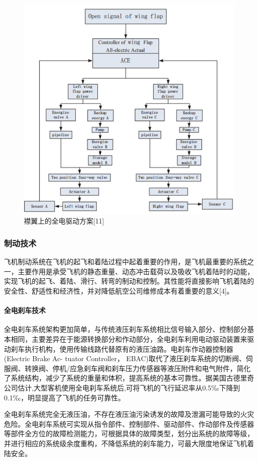\documentclass[12pt,a4paper]{report}
\begin{document}
\begin{figure}[htp]
\centering
   \includegraphics[width=.8\textwidth]{flapelectric.jpg}
    \caption{襟翼上的全电驱动方案[11]}
    \label{fig:flapelectric}
\end{figure}

\subsubsection{制动技术}
飞机制动系统在飞机的起飞和着陆过程中起着重要的作用，是飞机最重要的系统之一，主要作用是承受飞机的静态重量、动态冲击载荷以及吸收飞机着陆时的动能，实现飞机的起飞、着陆、滑行、转弯的制动和控制。其性能将直接影响飞机着陆的安全性、舒适性和经济性，并对降低航空公司维修成本有着重要的意义[4]。

\paragraph{全电刹车技术}
全电刹车系统架构更加简单，与传统液压刹车系统相比信号输入部分、控制部分基本相同，主要差异在于能源转换部分和作动部分，全电刹车利用电动驱动装置来驱动刹车执行机构，使用传输线路代替原有的液压油路。电刹车作动器控制器(Electric Brake Ac- tuator Controller， EBAC)取代了液压刹车系统的切断阀、伺服阀、转换阀、停机/应急刹车阀和刹车压力传感器等液压附件和电气附件，简化了系统结构，减少了系统的重量和体积，提高系统的基本可靠性。据美国古德里奇公司估计,大型客机使用全电刹车系统后,可将飞机的飞行延迟率从0.5‰下降到0.1‰，明显提高了飞机的任务可靠性。

全电刹车系统完全无液压油，不存在液压油污染诱发的故障及泄漏可能导致的火灾危险。全电刹车系统可实现从指令部件、控制部件、驱动部件、作动部件及传感器等部件全方位的故障检测能力，可根据具体的故障类型，划分出系统的故障等级，并进行相应的系统级余度重构，不降低系统的刹车能力，可最大限度地保证飞机着陆安全。
\end{document}
